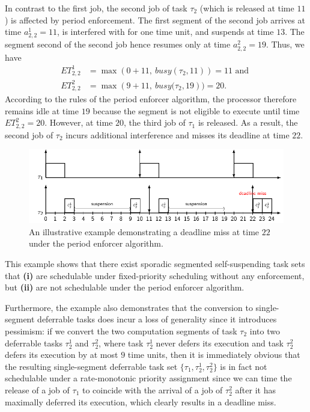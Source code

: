 In contrast to the first job, the second job of task $\tau_2$ (which is released at time $11$) is affected by period enforcement. The first segment of the second job arrives at time $a^1_{2,2} = 11$, is interfered with for one time unit, and suspends at time $13$. The segment second of the second job hence resumes only at time $a^2_{2,2} = 19$. Thus, we have
\begin{align*}
	ET_{2,2}^1 & = \max\left(0 + 11,\ \mathit{busy}(\tau_2, 11)\right) = 11  \text{ and }
\\
	ET_{2,2}^2 & = \max\left(9 + 11,\ \mathit{busy}(\tau_2, 19\right) ) = 20.
\end{align*}
According to the rules of the period enforcer algorithm, the processor therefore remains idle at time $19$ because the segment is not eligible to execute until time $ET_{2,2}^2 = 20$. However, at time $20$, the third job of $\tau_1$ is released. As a result, the second job of $\tau_2$ incurs additional interference and misses its deadline at time $22$.

\begin{figure}[t]
\begin{center}
\includegraphics[width=0.9\columnwidth]{figures/example}
\caption{An illustrative example demonstrating a deadline miss at time $22$ under the period enforcer algorithm.
\label{fig:example}%
}
\end{center}
\end{figure}



This example shows that there exist sporadic segmented self-suspending task sets that   \textbf{(i)} are schedulable under fixed-priority scheduling without any enforcement, but \textbf{(ii)} are not schedulable under the period enforcer algorithm.

Furthermore, the example also demonstrates that the conversion to single-segment deferrable tasks does incur a loss of generality since it introduces pessimism: if we convert the two computation segments of task $\tau_2$ into two deferrable tasks $\tau_2^1$ and $\tau_2^2$, where  task $\tau_2^1$ never defers its execution and task $\tau_2^2$ defers its execution by at most \emph{$9$} time units,  then it is immediately obvious that the resulting single-segment deferrable task set $\{\tau_1, \tau_2^1, \tau_2^2\}$ is in fact not schedulable under a rate-monotonic priority assignment since we can time the release of a job of $\tau_1$ to coincide with the arrival of a job of $\tau_2^2$ after it has maximally deferred its execution, which clearly results in a deadline miss.


